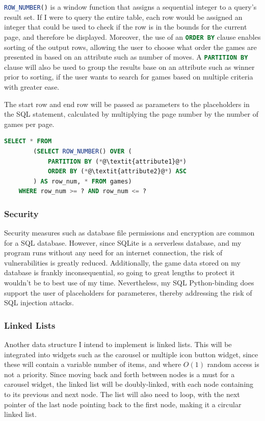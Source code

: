 \documentclass[../main/main.tex]{subfiles}
\begin{document}
\lstinline[language=SQL]{ROW_NUMBER()} is a window function that assigns a sequential integer to a query's result set. If I were to query the entire table, each row would be assigned an integer that could be used to check if the row is in the bounds for the current page, and therefore be displayed. Moreover, the use of an \lstinline[language=SQL]{ORDER BY} clause enables sorting of the output rows, allowing the user to choose what order the games are presented in based on an attribute such as number of moves. A \lstinline[language=SQL]{PARTITION BY} clause will also be used to group the results base on an attribute such as winner prior to sorting, if the user wants to search for games based on multiple criteria with greater ease.

The start row and end row will be passed as parameters to the placeholders in the SQL statement, calculated by multiplying the page number by the number of games per page.

\begin{lstlisting}[language=SQL, frame=single]
    SELECT * FROM
        (SELECT ROW_NUMBER() OVER (
            PARTITION BY (*@\textit{attribute1}@*)
            ORDER BY (*@\textit{attribute2}@*) ASC
        ) AS row_num, * FROM games)
    WHERE row_num >= ? AND row_num <= ?
\end{lstlisting}

\subsubsection*{Security}
Security measures such as database file permissions and encryption are common for a SQL database. However, since SQLite is a serverless database, and my program runs without any need for an internet connection, the risk of vulnerabilities is greatly reduced. Additionally, the game data stored on my database is frankly inconsequential, so going to great lengths to protect it wouldn't be to best use of my time. Nevertheless, my SQL Python-binding does support the user of placeholders for parameteres, thereby addressing the risk of SQL injection attacks.

\subsubsection{Linked Lists}
Another data structure I intend to implement is linked lists. This will be integrated into widgets such as the carousel or multiple icon button widget, since these will contain a variable number of items, and where $O(1)$ random access is not a priority. Since moving back and forth between nodes is a must for a carousel widget, the linked list will be doubly-linked, with each node containing to its previous and next node. The list will also need to loop, with the next pointer of the last node pointing back to the first node, making it a circular linked list.
\end{document}
